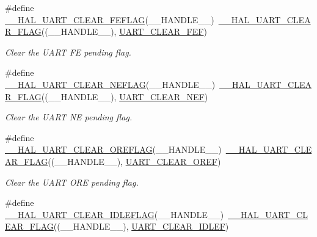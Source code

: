 \begin{DoxyCompactItemize}
\#define \hyperlink{group___u_a_r_t___exported___macros_gae1dfc7777b089a10464841045b524caa}{\+\_\+\+\_\+\+H\+A\+L\+\_\+\+U\+A\+R\+T\+\_\+\+C\+L\+E\+A\+R\+\_\+\+F\+E\+F\+L\+AG}(\+\_\+\+\_\+\+H\+A\+N\+D\+L\+E\+\_\+\+\_\+)~\hyperlink{group___u_a_r_t___exported___macros_ga9bd035161d41cde4f2568c7af06493bf}{\+\_\+\+\_\+\+H\+A\+L\+\_\+\+U\+A\+R\+T\+\_\+\+C\+L\+E\+A\+R\+\_\+\+F\+L\+AG}((\+\_\+\+\_\+\+H\+A\+N\+D\+L\+E\+\_\+\+\_\+), \hyperlink{group___u_a_r_t___i_t___c_l_e_a_r___flags_ga2040edf7a1daa2e9f352364e285ef5c3}{U\+A\+R\+T\+\_\+\+C\+L\+E\+A\+R\+\_\+\+F\+EF})
\begin{DoxyCompactList}\small\item\em Clear the U\+A\+RT FE pending flag. \end{DoxyCompactList}\item 
\#define \hyperlink{group___u_a_r_t___exported___macros_gaa1f69421585b3ada4d2b81d502a3ae6b}{\+\_\+\+\_\+\+H\+A\+L\+\_\+\+U\+A\+R\+T\+\_\+\+C\+L\+E\+A\+R\+\_\+\+N\+E\+F\+L\+AG}(\+\_\+\+\_\+\+H\+A\+N\+D\+L\+E\+\_\+\+\_\+)~\hyperlink{group___u_a_r_t___exported___macros_ga9bd035161d41cde4f2568c7af06493bf}{\+\_\+\+\_\+\+H\+A\+L\+\_\+\+U\+A\+R\+T\+\_\+\+C\+L\+E\+A\+R\+\_\+\+F\+L\+AG}((\+\_\+\+\_\+\+H\+A\+N\+D\+L\+E\+\_\+\+\_\+), \hyperlink{group___u_a_r_t___i_t___c_l_e_a_r___flags_gad5b9aafb495296d917a5d85e63383396}{U\+A\+R\+T\+\_\+\+C\+L\+E\+A\+R\+\_\+\+N\+EF})
\begin{DoxyCompactList}\small\item\em Clear the U\+A\+RT NE pending flag. \end{DoxyCompactList}\item 
\#define \hyperlink{group___u_a_r_t___exported___macros_ga9cdc2f2d55eaaa7895996bf6848df42e}{\+\_\+\+\_\+\+H\+A\+L\+\_\+\+U\+A\+R\+T\+\_\+\+C\+L\+E\+A\+R\+\_\+\+O\+R\+E\+F\+L\+AG}(\+\_\+\+\_\+\+H\+A\+N\+D\+L\+E\+\_\+\+\_\+)~\hyperlink{group___u_a_r_t___exported___macros_ga9bd035161d41cde4f2568c7af06493bf}{\+\_\+\+\_\+\+H\+A\+L\+\_\+\+U\+A\+R\+T\+\_\+\+C\+L\+E\+A\+R\+\_\+\+F\+L\+AG}((\+\_\+\+\_\+\+H\+A\+N\+D\+L\+E\+\_\+\+\_\+), \hyperlink{group___u_a_r_t___i_t___c_l_e_a_r___flags_ga3bc97b70293f9a7bf8cc21a74094afad}{U\+A\+R\+T\+\_\+\+C\+L\+E\+A\+R\+\_\+\+O\+R\+EF})
\begin{DoxyCompactList}\small\item\em Clear the U\+A\+RT O\+RE pending flag. \end{DoxyCompactList}\item 
\#define \hyperlink{group___u_a_r_t___exported___macros_ga1345aa0af53d82269b13835c225e91d0}{\+\_\+\+\_\+\+H\+A\+L\+\_\+\+U\+A\+R\+T\+\_\+\+C\+L\+E\+A\+R\+\_\+\+I\+D\+L\+E\+F\+L\+AG}(\+\_\+\+\_\+\+H\+A\+N\+D\+L\+E\+\_\+\+\_\+)~\hyperlink{group___u_a_r_t___exported___macros_ga9bd035161d41cde4f2568c7af06493bf}{\+\_\+\+\_\+\+H\+A\+L\+\_\+\+U\+A\+R\+T\+\_\+\+C\+L\+E\+A\+R\+\_\+\+F\+L\+AG}((\+\_\+\+\_\+\+H\+A\+N\+D\+L\+E\+\_\+\+\_\+), \hyperlink{group___u_a_r_t___i_t___c_l_e_a_r___flags_ga75ee9be0ac2236931ef3d9514e7dedf4}{U\+A\+R\+T\+\_\+\+C\+L\+E\+A\+R\+\_\+\+I\+D\+L\+EF})

\end{DoxyCompactItemize}

